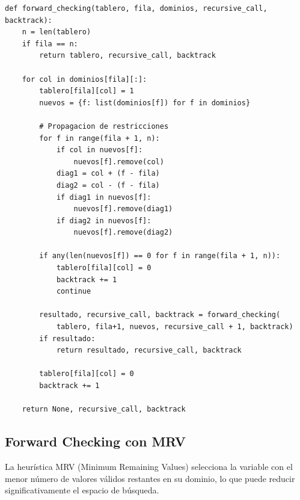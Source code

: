 \documentclass[12pt,a4paper]{article}
\begin{document}
\begin{lstlisting}[caption=Implementación de Forward Checking]
def forward_checking(tablero, fila, dominios, recursive_call, backtrack):
    n = len(tablero)
    if fila == n:
        return tablero, recursive_call, backtrack

    for col in dominios[fila][:]:
        tablero[fila][col] = 1
        nuevos = {f: list(dominios[f]) for f in dominios}
        
        # Propagacion de restricciones
        for f in range(fila + 1, n):
            if col in nuevos[f]:
                nuevos[f].remove(col)
            diag1 = col + (f - fila)
            diag2 = col - (f - fila)
            if diag1 in nuevos[f]:
                nuevos[f].remove(diag1)
            if diag2 in nuevos[f]:
                nuevos[f].remove(diag2) 

        if any(len(nuevos[f]) == 0 for f in range(fila + 1, n)):
            tablero[fila][col] = 0
            backtrack += 1
            continue

        resultado, recursive_call, backtrack = forward_checking(
            tablero, fila+1, nuevos, recursive_call + 1, backtrack)
        if resultado: 
            return resultado, recursive_call, backtrack

        tablero[fila][col] = 0
        backtrack += 1

    return None, recursive_call, backtrack
\end{lstlisting}
\newpage
\subsection{Forward Checking con MRV}

La heurística MRV (Minimum Remaining Values) selecciona la variable con el menor número de valores válidos restantes en su dominio, lo que puede reducir significativamente el espacio de búsqueda.
\end{document}
